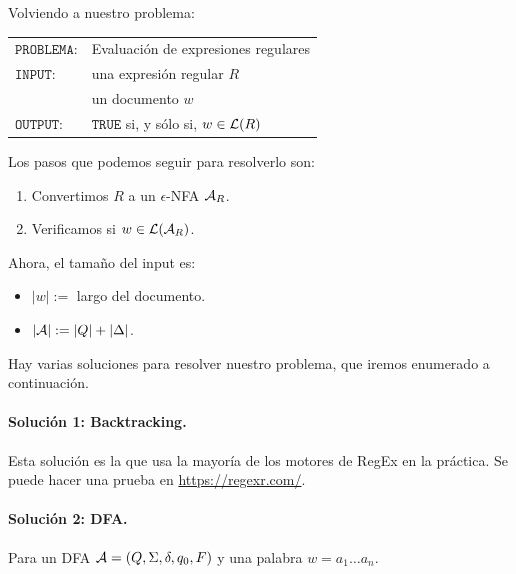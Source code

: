 Volviendo a nuestro problema:
\begin{table}[H]
    \centering
    \begin{tabular}{ll}
        $\texttt{PROBLEMA:}$ & Evaluación de expresiones regulares              \\
        $\texttt{INPUT:}$    & una expresión regular $R$                        \\
                             & un documento $w$                                 \\
        $\texttt{OUTPUT:}$   & $\texttt{TRUE}$ si, y sólo si, $w \in \mathcal{L}(R)$
    \end{tabular}
\end{table}

Los pasos que podemos seguir para resolverlo son:
\begin{enumerate}
    \item Convertimos $R$ a un $\epsilon$-NFA $\mathcal{A}_R$.
    \item Verificamos si $w \in \mathcal{L}(\mathcal{A}_R)$.
\end{enumerate}
Ahora, el tamaño del input es:
\begin{itemize}
    \item $|w|:=$ largo del documento.
    \item $|\mathcal{A}|:= |Q| + |\Delta|$.
\end{itemize}

Hay varias soluciones para resolver nuestro problema, que iremos enumerado a continuación.

\paragraph{Solución 1: Backtracking.} Esta solución es la que usa la mayoría de los motores de RegEx en la práctica. Se puede hacer una prueba en \url{https://regexr.com/}.

\paragraph{Solución 2: DFA.} Para un DFA $\mathcal{A} = (Q,\Sigma,\delta, q_0, F)$ y una palabra $w = a_1 \ldots a_n$.
\vspace{-8pt}
\begin{algorithm}[hbt!]
    \DontPrintSemicolon
\end{algorithm}
\vspace{-8pt}
